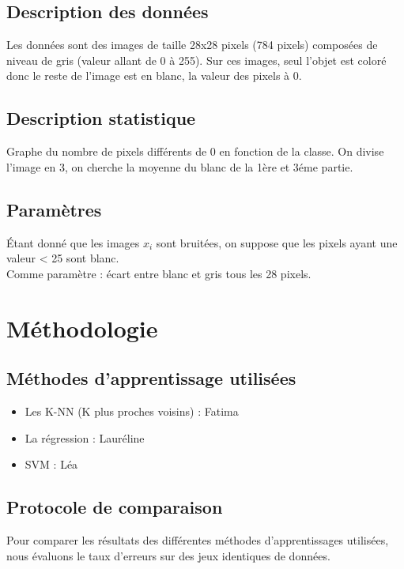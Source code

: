 \documentclass[a4paper,11pt]{article}
\begin{document}
	\subsection{Description des données}
		Les données sont des images de taille 28x28 pixels (784 pixels) composées de niveau de gris (valeur allant de 0 à 255). Sur ces images, seul l’objet est coloré donc le reste de l’image est en blanc, la valeur des pixels à 0.

	\subsection{Description statistique}
		Graphe du nombre de pixels différents de 0 en fonction de la classe.
		On divise l’image en 3, on cherche la moyenne du blanc de la 1ère et 3éme partie.

	\subsection{Paramètres}
		Étant donné que les images $x_i$ sont bruitées, on suppose que les pixels ayant une valeur < 25 sont blanc.\\Comme paramètre : écart entre blanc et gris tous les 28 pixels.


\newpage
\section{Méthodologie}
	\subsection{Méthodes d'apprentissage utilisées}
		\begin{itemize}
			\item Les K-NN (K plus proches voisins) : Fatima
			\item La régression : Lauréline
			\item SVM : Léa
		\end{itemize}

	\subsection{Protocole de comparaison}
		Pour comparer les résultats des différentes méthodes d'apprentissages utilisées, nous évaluons le taux d’erreurs sur des jeux identiques de données.
\end{document}
